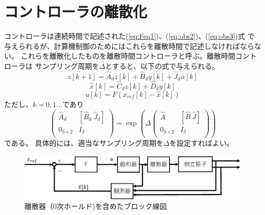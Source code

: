 \section{コントローラの離散化}
	コントローラは連続時間で記述された(\ref{eq:Feq1})、(\ref{eq:obs2})、(\ref{eq:obs3})式
	で与えられるが、計算機制御のためにはこれらを離散時間で記述しなければならない。
	これらを離散化したものを離散時間コントローラと呼ぶ。離散時間コントローラは
	サンプリング周期を$\Delta$とすると、以下の式で与えられる。
	\begin{equation}
		z[k+1] = \hat{A}_{d}z[k]+\hat{B}_{d}y[k]+\hat{J}_{d}u[k]
	\end{equation}
	\begin{equation}
		\hat{x}[k] = \hat{C}_{d}z[k] + \hat{D}_{d}y[k]
	\end{equation}
	\begin{equation}
		u[k] = F(x_{ref}[k] - \hat{x}[k])
	\end{equation}
	ただし、$k = 0,1\ldots$であり
	\[
		\left(
		\begin{array}{cc}
			\hat{A}_{d} & [\hat{B}_{d}\ \hat{J}_{d}]\\
			0_{3×2} & I_{3}\\
		\end{array}
		\right)=\exp\left(\Delta\left(
		\begin{array}{cc}
			\hat{A} & [\hat{B}\ \hat{J}]\\
			0_{3×2} & I_{3}\\
		\end{array}
		\right)\right)
	\]
	である。
	具体的には、適当なサンプリング周期を$\Delta$を設定すればよい。
	\begin{figure}[h]
		\centering
		\includegraphics[width=0.8\linewidth]{gazo/controll_discrete.eps}
		\caption{離散器（0次ホールド)を含めたブロック線図}
		\label{image:cDISCRETE}
	\end{figure}
